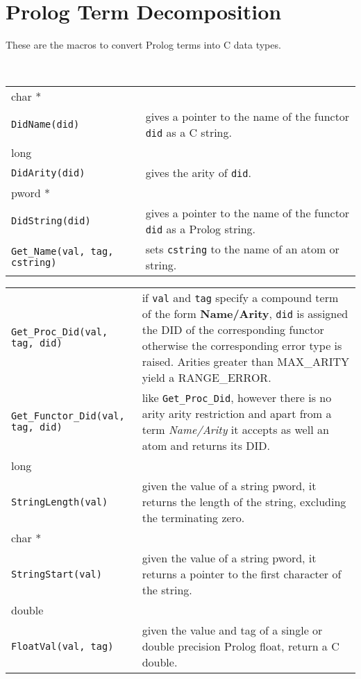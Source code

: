 
\section{Prolog Term Decomposition}
These are the macros to convert Prolog terms into C data types.

\noindent
 \\
\begin{tabular}{|p{7.7cm}p{7.5cm}|}
\hline
char * &\\
{\tt DidName(did)} &
gives a pointer to the name of the functor {\tt did} as a C string.\\

long &\\
{\tt DidArity(did)} & gives the arity of {\tt did}. \\

pword * &\\
{\tt DidString(did)} &
gives a pointer to the name of the functor {\tt did} as a Prolog string.\\

{\tt Get_Name(val, tag, cstring)} &
sets {\tt cstring} to the name of an atom or string. \\
\hline
\end{tabular}

\noindent
\begin{tabular}{|p{7.7cm}p{7.5cm}|}
\hline
{\tt Get_Proc_Did(val, tag, did)} & 
if {\tt val} and {\tt tag} specify a compound term of the form
{\bf Name/Arity}, {\tt did} is assigned the DID of the
corresponding functor otherwise the corresponding
error type is raised. Arities greater than MAX_ARITY
yield a RANGE_ERROR.\\

{\tt Get_Functor_Did(val, tag, did)} & 
like {\tt Get_Proc_Did}, however there is no arity
arity restriction and apart from a term {\it Name/Arity}
it accepts as well an atom and returns its DID.\\

long &\\
{\tt StringLength(val)} & given the value of a string pword, it returns the
length of the string, excluding the terminating zero.\\

char * &\\
{\tt StringStart(val)} & given the value of a string pword, it returns a
pointer to the first character of the string.\\

double &\\
{\tt FloatVal(val, tag)} & given the value and tag of a single or double
precision Prolog float, return a C double.\\
\hline
\end{tabular}

